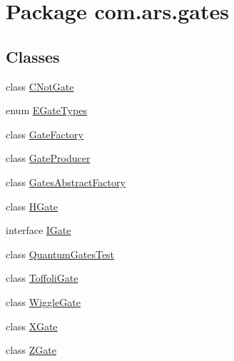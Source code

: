 \hypertarget{namespacecom_1_1ars_1_1gates}{}\section{Package com.\+ars.\+gates}
\label{namespacecom_1_1ars_1_1gates}
\subsection*{Classes}
\begin{DoxyCompactItemize}
\item 
class \hyperlink{classcom_1_1ars_1_1gates_1_1_c_not_gate}{C\+Not\+Gate}
\item 
enum \hyperlink{enumcom_1_1ars_1_1gates_1_1_e_gate_types}{E\+Gate\+Types}
\item 
class \hyperlink{classcom_1_1ars_1_1gates_1_1_gate_factory}{Gate\+Factory}
\item 
class \hyperlink{classcom_1_1ars_1_1gates_1_1_gate_producer}{Gate\+Producer}
\item 
class \hyperlink{classcom_1_1ars_1_1gates_1_1_gates_abstract_factory}{Gates\+Abstract\+Factory}
\item 
class \hyperlink{classcom_1_1ars_1_1gates_1_1_h_gate}{H\+Gate}
\item 
interface \hyperlink{interfacecom_1_1ars_1_1gates_1_1_i_gate}{I\+Gate}
\item 
class \hyperlink{classcom_1_1ars_1_1gates_1_1_quantum_gates_test}{Quantum\+Gates\+Test}
\item 
class \hyperlink{classcom_1_1ars_1_1gates_1_1_toffoli_gate}{Toffoli\+Gate}
\item 
class \hyperlink{classcom_1_1ars_1_1gates_1_1_wiggle_gate}{Wiggle\+Gate}
\item 
class \hyperlink{classcom_1_1ars_1_1gates_1_1_x_gate}{X\+Gate}
\item 
class \hyperlink{classcom_1_1ars_1_1gates_1_1_z_gate}{Z\+Gate}
\end{DoxyCompactItemize}
